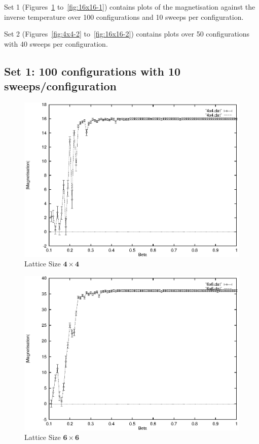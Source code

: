 \documentclass[a4paper]{IEEEtran}
\begin{document}
    Set 1 (Figures~\ref{fig:4x4-1} to~\ref{fig:16x16-1})
    contains plots of the magnetisation
    against the inverse temperature over 100 configurations
    and 10 sweeps per configuration. 

    Set 2 (Figures~\ref{fig:4x4-2} to~\ref{fig:16x16-2})
    contains plots over 50
    configurations with 40 sweeps per configuration.


    \subsection{Set 1: 100 configurations with 10 sweeps/configuration} 

    
    \begin{figure}[h] 
    \caption{Lattice Size $\mathbf{4 \times 4}$}
    \label{fig:4x4-1}
    \begin{center}
        \includegraphics[width=0.99\columnwidth]{4x4_1.eps}
    \end{center}
    \end{figure} 

    \begin{figure}
    \caption{Lattice Size $\mathbf{6 \times 6}$}
    \label{fig:6x6-1}
    \begin{center}
        \includegraphics[width=0.99\columnwidth]{6x6_1.eps}
    \end{center}
    \end{figure} 
\end{document}
